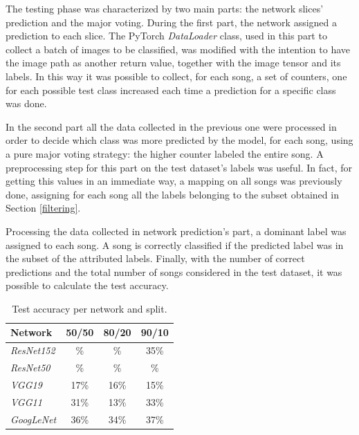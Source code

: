 \documentclass[10pt,twocolumn,letterpaper]{article}
\begin{document}
The testing phase was characterized by two main parts: the network slices' prediction and the major voting.
During the first part, the network assigned a prediction to each slice. The PyTorch \textit{DataLoader} class, used in this part to collect a batch of images to be classified, was modified with the intention to have the image path as another return value, together with the image tensor and its labels. In this way it was possible to collect, for each song, a set of counters, one for each possible test class increased each time a prediction for a specific class was done.

In the second part all the data collected in the previous one were processed in order to decide which class was more predicted by the model, for each song, using a pure major voting strategy: the higher counter labeled the entire song. A preprocessing step for this part on the test dataset's labels was useful. In fact, for getting this values in an immediate way, a mapping on all songs was previously done, assigning for each song all the labels belonging to the subset obtained in Section \ref{filtering}.

Processing the data collected in network prediction's part, a dominant label was assigned to each song. A song is correctly classified if the predicted label was in the subset of the attributed labels. Finally, with the number of correct predictions and the total number of songs considered in the test dataset, it was possible to calculate the test accuracy.



   \begin{table}[ht]
      \begin{center}
      \def\arraystretch{1.5}
      \begin{tabular}{l|c|c|c}
         \textbf{Network} & \textbf{50/50} & \textbf{80/20} & \textbf{90/10} \\
      \hline
      \textit{ResNet152} & \% & \% & 35\% \\
      \hline
      \textit{ResNet50} & \% & \% & \% \\
      \hline
      \textit{VGG19} & 17\% & 16\% & 15\% \\
      \hline
      \textit{VGG11} & 31\% & 13\% & 33\% \\
      \hline
      \textit{GoogLeNet} & 36\% & 34\% & 37\% \\
      \end{tabular}
      \end{center}
      \caption{Test accuracy per network and split.}
      \label{tab:test}
      \end{table}
\end{document}
